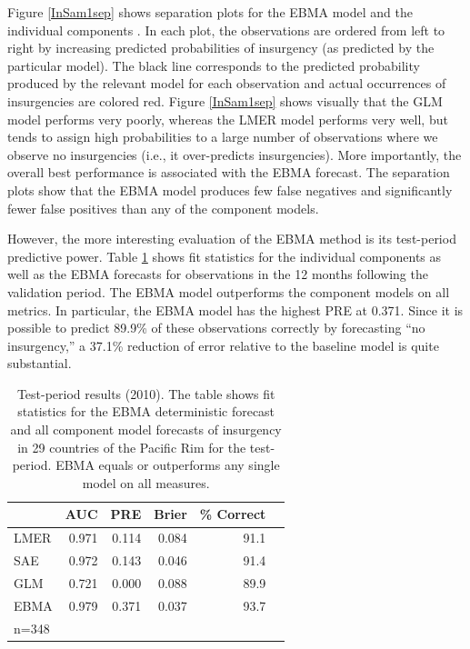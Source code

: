 Figure \ref{InSam1sep} shows separation plots for the EBMA model and
the individual components \citep{Greenhill:2011}. In each plot, the
observations are ordered from left to right by increasing predicted
probabilities of insurgency (as predicted by the particular
model). The black line corresponds to the predicted probability
produced by the relevant model for each observation and actual
occurrences of insurgencies are colored red.  Figure \ref{InSam1sep}
shows visually that the GLM model performs very poorly, whereas the
LMER model performs very well, but tends to assign high probabilities
to a large number of observations where we observe no insurgencies
(i.e., it over-predicts insurgencies).  More importantly, the overall
best performance is associated with the EBMA forecast. The separation
plots show that the EBMA model produces few false negatives and
significantly fewer false positives than any of the component models.


However, the more interesting evaluation of the EBMA method is its
test-period predictive power. Table \ref{OutSam1} shows fit statistics
for the individual components as well as the EBMA forecasts for
observations in the 12 months following the validation period.  The
EBMA model outperforms the component models on all metrics.  In
particular, the EBMA model has the highest PRE at 0.371.  Since it is
possible to predict 89.9\% of these observations correctly by
forecasting ``no insurgency,'' a 37.1\% reduction of error relative to
the baseline model is quite substantial.

\begin{table}[h!]
\small
\begin{center}
  \caption{\footnotesize Test-period results (2010).  The table shows
    fit statistics for the EBMA deterministic forecast and all
    component model forecasts of insurgency in 29 countries of the
    Pacific Rim for the test-period.  EBMA equals or outperforms any single model on all
    measures.}\label{OutSam1}
\begin{tabular}{lrrrrr}
  \toprule
 & AUC & PRE & Brier & \% Correct   \\ 
  \midrule
LMER  &0.971& 0.114& 0.084&      91.1\\
SAE & 0.972& 0.143& 0.046&      91.4\\
GLM& 0.721& 0.000& 0.088&      89.9\\
EBMA &0.979& 0.371& 0.037&      93.7\\
   \bottomrule
n=348 \\
\end{tabular}
\end{center}
\end{table}

